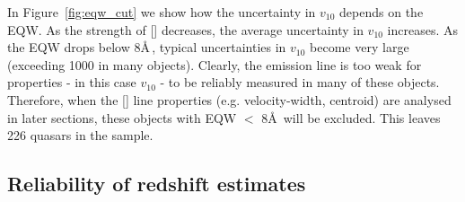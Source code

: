 In Figure~\ref{fig:eqw_cut} we show how the uncertainty in $v_{10}$ depends on the EQW. 
As the strength of [] decreases, the average uncertainty in $v_{10}$ increases. 
As the EQW drops below 8\AA\,, typical uncertainties in $v_{10}$ become very large (exceeding 1000 \kms in many objects). 
Clearly, the emission line is too weak for properties - in this case $v_{10}$ - to be reliably measured in many of these objects. 
Therefore, when the [] line properties (e.g. velocity-width, centroid) are analysed in later sections, these objects with EQW $<$ 8\AA\, will be excluded. 
This leaves 226 quasars in the sample. 

\subsection{Reliability of redshift estimates}

